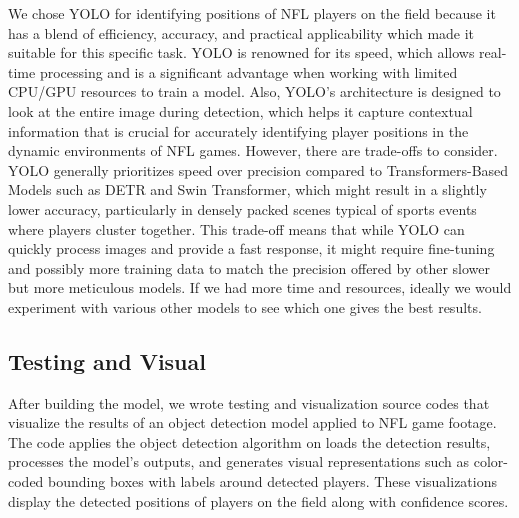 We chose YOLO for identifying positions of NFL players on the field because it has a blend of efficiency, accuracy, and practical applicability which made it suitable for this specific task. YOLO is renowned for its speed, which allows real-time processing and is a significant advantage when working with limited CPU/GPU resources to train a model.
 Also, YOLO's architecture is designed to look at the entire image during detection, which helps it capture contextual information that is crucial for accurately identifying player positions in the dynamic environments of NFL games.
 However, there are trade-offs to consider. YOLO generally prioritizes speed over precision compared to Transformers-Based Models such as DETR and Swin Transformer, which might result in a slightly lower accuracy, particularly in densely packed scenes typical of sports events where players cluster together. This trade-off means that while YOLO can quickly process images and provide a fast response, it might require fine-tuning and possibly more training data to match the precision offered by other slower but more meticulous models.
 If we had more time and resources, ideally we would experiment with various other models to see which one gives the best results.

\subsection{Testing and Visual}

After building the model, we wrote testing and visualization source codes that visualize the results of an object detection model applied to NFL game footage. The code applies the object detection algorithm on loads the detection results, processes the model's outputs, and generates visual representations such as color-coded bounding boxes with labels around detected players. These visualizations display the detected positions of players on the field along with confidence scores.

